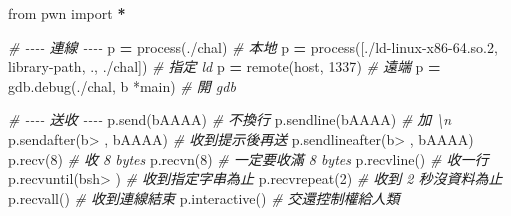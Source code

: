 \documentclass[10pt,a4paper]{article}
\newenvironment{Shaded}{\begin{snugshade}}{\end{snugshade}}
\newcommand{\CommentTok}[1]{\textcolor[rgb]{0.56,0.35,0.01}{\textit{#1}}}
\newcommand{\DecValTok}[1]{\textcolor[rgb]{0.00,0.00,0.81}{#1}}
\newcommand{\ImportTok}[1]{#1}
\newcommand{\NormalTok}[1]{#1}
\newcommand{\OperatorTok}[1]{\textcolor[rgb]{0.81,0.36,0.00}{\textbf{#1}}}
\newcommand{\StringTok}[1]{\textcolor[rgb]{0.31,0.60,0.02}{#1}}
\renewenvironment{Shaded}{%
  \def\FrameCommand{\fboxsep=3.2pt\colorbox{shadecolor}}%
  \MakeFramed{\advance\hsize-\width\FrameRestore\small}%
}{%
  \endMakeFramed
}
\begin{document}
\begin{Shaded}
\begin{Highlighting}[]
\ImportTok{from}\NormalTok{ pwn }\ImportTok{import} \OperatorTok{*}

\CommentTok{\# {-}{-}{-}{-} 連線 {-}{-}{-}{-}}
\NormalTok{p }\OperatorTok{=}\NormalTok{ process(}\StringTok{\textquotesingle{}./chal\textquotesingle{}}\NormalTok{)                      }\CommentTok{\# 本地}
\NormalTok{p }\OperatorTok{=}\NormalTok{ process([}\StringTok{\textquotesingle{}./ld{-}linux{-}x86{-}64.so.2\textquotesingle{}}\NormalTok{, }\StringTok{\textquotesingle{}{-}{-}library{-}path\textquotesingle{}}\NormalTok{, }\StringTok{\textquotesingle{}.\textquotesingle{}}\NormalTok{, }\StringTok{\textquotesingle{}./chal\textquotesingle{}}\NormalTok{])   }\CommentTok{\# 指定 ld}
\NormalTok{p }\OperatorTok{=}\NormalTok{ remote(}\StringTok{\textquotesingle{}host\textquotesingle{}}\NormalTok{, }\DecValTok{1337}\NormalTok{)                   }\CommentTok{\# 遠端}
\NormalTok{p }\OperatorTok{=}\NormalTok{ gdb.debug(}\StringTok{\textquotesingle{}./chal\textquotesingle{}}\NormalTok{, }\StringTok{\textquotesingle{}b *main\textquotesingle{}}\NormalTok{)         }\CommentTok{\# 開 gdb}

\CommentTok{\# {-}{-}{-}{-} 送收 {-}{-}{-}{-}}
\NormalTok{p.send(}\StringTok{b\textquotesingle{}AAAA\textquotesingle{}}\NormalTok{)                }\CommentTok{\# 不換行}
\NormalTok{p.sendline(}\StringTok{b\textquotesingle{}AAAA\textquotesingle{}}\NormalTok{)            }\CommentTok{\# 加 \textquotesingle{}\textbackslash{}n\textquotesingle{}}
\NormalTok{p.sendafter(}\StringTok{b\textquotesingle{}\textgreater{} \textquotesingle{}}\NormalTok{, }\StringTok{b\textquotesingle{}AAAA\textquotesingle{}}\NormalTok{)    }\CommentTok{\# 收到提示後再送}
\NormalTok{p.sendlineafter(}\StringTok{b\textquotesingle{}\textgreater{} \textquotesingle{}}\NormalTok{, }\StringTok{b\textquotesingle{}AAAA\textquotesingle{}}\NormalTok{)}
\NormalTok{p.recv(}\DecValTok{8}\NormalTok{)                      }\CommentTok{\# 收 8 bytes}
\NormalTok{p.recvn(}\DecValTok{8}\NormalTok{)                     }\CommentTok{\# 一定要收滿 8 bytes}
\NormalTok{p.recvline()                   }\CommentTok{\# 收一行}
\NormalTok{p.recvuntil(}\StringTok{b\textquotesingle{}sh\textgreater{} \textquotesingle{}}\NormalTok{)           }\CommentTok{\# 收到指定字串為止}
\NormalTok{p.recvrepeat(}\DecValTok{2}\NormalTok{)                }\CommentTok{\# 收到 2 秒沒資料為止}
\NormalTok{p.recvall()                    }\CommentTok{\# 收到連線結束}
\NormalTok{p.interactive()                }\CommentTok{\# 交還控制權給人類}


\end{Highlighting}
\end{Shaded}
\end{document}
